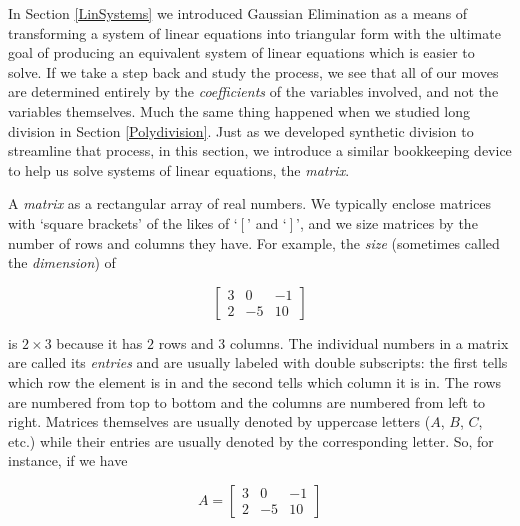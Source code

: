 

\setcounter{footnote}{0}

\label{AugMatrices}

\setlength{\extrarowheight}{0pt}

In Section \ref{LinSystems} we introduced Gaussian Elimination as a means of transforming a system of linear equations into triangular form with the ultimate goal of producing an equivalent system of linear equations which is easier to solve.  If we take a step back and study the process, we see that all of our moves are determined entirely by the \textit{coefficients} of the variables involved, and not the variables themselves.  Much the same thing happened when we studied long division in Section \ref{Polydivision}. Just as we developed synthetic division to streamline that process, in this section, we introduce a similar bookkeeping device to help us solve systems of linear equations, the \textit{matrix}. 

A \textit{matrix} as a rectangular array of real numbers.  We typically enclose matrices with `square brackets' of the likes of  `$\left[ \right.$' and `$\left. \right]$', and we size matrices by the number of rows and columns they have.  For example, the  \textit{size} (sometimes called the \textit{dimension}) of 

\[ \left[ \begin{array}{rrr} 3 & 0 & -1 \\ 
2 & -5 & 10 \end{array} \right]\] 

is  $2 \times 3$  because it has $2$ rows and $3$ columns.  The individual numbers in a matrix are called its   \textit{entries} and are usually labeled with double subscripts: the first tells which row the element is in and the second tells which column it is in.  The rows are numbered from top to bottom and the columns are numbered from left to right.  Matrices themselves are usually denoted by uppercase letters ($A$, $B$, $C$, etc.) while their entries are usually denoted by the corresponding letter.  So, for instance, if we have 

\[ A = \left[ \begin{array}{rrr} 3 & 0 & -1 \\ 
2 & -5 & 10 \end{array} \right]\] 

